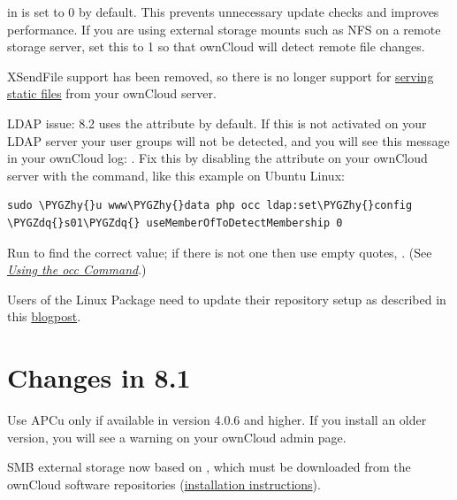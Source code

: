\documentclass[letterpaper,10pt,english]{sphinxmanual}
\def\PYGZhy{\char`\-}
\def\PYGZdq{\char`\"}
\begin{document}
 in  is set to 0 by default. This
prevents unnecessary update checks and improves performance. If you are using
external storage mounts such as NFS on a remote storage server, set this to 1
so that ownCloud will detect remote file changes.

XSendFile support has been removed, so there is no longer support for \href{https://doc.owncloud.org/server/8.1/admin\_manual/configuration\_files/serving\_static\_files\_configuration.html}{serving
static files} from your ownCloud server.

LDAP issue: 8.2 uses the  attribute by default. If this is not
activated on your LDAP server your user groups will not be detected, and you
will see this message in your ownCloud log: .
Fix this by disabling the  attribute on your ownCloud server with
the  command, like this example on Ubuntu Linux:

\begin{Verbatim}[commandchars=\\\{\}]
sudo \PYGZhy{}u www\PYGZhy{}data php occ ldap:set\PYGZhy{}config \PYGZdq{}s01\PYGZdq{} useMemberOfToDetectMembership 0
\end{Verbatim}

Run  to find the correct 
value; if there is not one then use empty quotes, . (See
{\hyperref[configuration_server/occ_command::doc]{\emph{Using the occ Command}}}.)

Users of the Linux Package need to update their repository setup as described
in this \href{https://owncloud.org/blog/upgrading-to-owncloud-server-8-2/}{blogpost}.


\section{Changes in 8.1}
\label{release_notes:changes-in-8-1}
Use APCu only if available in version 4.0.6 and higher. If you install an older version,
you will see a  warning on your ownCloud admin page.

SMB external storage now based on , which must be downloaded
from the ownCloud software repositories (\href{https://software.opensuse.org/download.html?project=isv\%3AownCloud\%3Acommunity\%3A8.1\&package=php5-libsmbclient}{installation instructions}).
\end{document}
